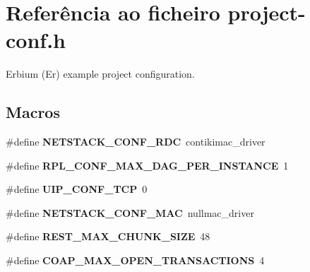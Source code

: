 \hypertarget{project-conf_8h}{\section{Referência ao ficheiro project-\/conf.h}
\label{project-conf_8h}
}


\begin{DoxyVerb} Erbium (Er) example project configuration.\end{DoxyVerb}
  


\subsection*{Macros}
\begin{DoxyCompactItemize}
\item 
\hypertarget{project-conf_8h_a713b73648671626232b7f8c3dca1d939}{\#define {\bfseries N\+E\+T\+S\+T\+A\+C\+K\+\_\+\+C\+O\+N\+F\+\_\+\+R\+D\+C}~contikimac\+\_\+driver}\label{project-conf_8h_a713b73648671626232b7f8c3dca1d939}

\item 
\hypertarget{project-conf_8h_aeb62bc51ff0305451eabedcc54a0fdfa}{\#define {\bfseries R\+P\+L\+\_\+\+C\+O\+N\+F\+\_\+\+M\+A\+X\+\_\+\+D\+A\+G\+\_\+\+P\+E\+R\+\_\+\+I\+N\+S\+T\+A\+N\+C\+E}~1}\label{project-conf_8h_aeb62bc51ff0305451eabedcc54a0fdfa}

\item 
\hypertarget{project-conf_8h_af040984efb79765f3079be76b7499168}{\#define {\bfseries U\+I\+P\+\_\+\+C\+O\+N\+F\+\_\+\+T\+C\+P}~0}\label{project-conf_8h_af040984efb79765f3079be76b7499168}

\item 
\hypertarget{project-conf_8h_a4be5f67e37edb6a213d34e8c1968544f}{\#define {\bfseries N\+E\+T\+S\+T\+A\+C\+K\+\_\+\+C\+O\+N\+F\+\_\+\+M\+A\+C}~nullmac\+\_\+driver}\label{project-conf_8h_a4be5f67e37edb6a213d34e8c1968544f}

\item 
\hypertarget{project-conf_8h_a9a3efae7c7faf00ea590ce25ba7eccc3}{\#define {\bfseries R\+E\+S\+T\+\_\+\+M\+A\+X\+\_\+\+C\+H\+U\+N\+K\+\_\+\+S\+I\+Z\+E}~48}\label{project-conf_8h_a9a3efae7c7faf00ea590ce25ba7eccc3}

\item 
\hypertarget{project-conf_8h_a47436509e3fc2f8dfbcbd463b0d97253}{\#define {\bfseries C\+O\+A\+P\+\_\+\+M\+A\+X\+\_\+\+O\+P\+E\+N\+\_\+\+T\+R\+A\+N\+S\+A\+C\+T\+I\+O\+N\+S}~4}\label{project-conf_8h_a47436509e3fc2f8dfbcbd463b0d97253}


\end{DoxyCompactItemize}
